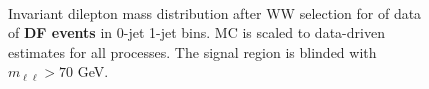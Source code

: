 \begin{figure}[!hbtp]
\centering
{}
 \\
\caption{Invariant dilepton mass distribution after WW selection for \intlumiEightTeV of data  
of {\bf DF events} in 0-jet  1-jet  bins.   
MC is scaled to data-driven estimates for all processes.
The signal region is blinded with $m_{\ell\ell}>70$ GeV. }
\label{fig:ww_dilmass}
\end{figure}

